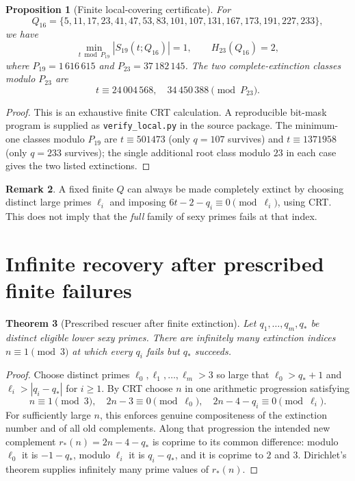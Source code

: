 \documentclass[11pt,a4paper]{article}
\newtheorem{theorem}{Theorem}[section]
\newtheorem{proposition}[theorem]{Proposition}
\theoremstyle{definition}
\newtheorem{remark}[theorem]{Remark}
\begin{document}
\begin{proposition}[Finite local-covering certificate]\label{prop:local}
For
\[
 Q_{16}=\{5,11,17,23,41,47,53,83,101,107,131,167,
 173,191,227,233\},
\]
we have
\[
 \min_{t\bmod P_{19}}|S_{19}(t;Q_{16})|=1,
 \qquad H_{23}(Q_{16})=2,
\]
where $P_{19}=1\,616\,615$ and $P_{23}=37\,182\,145$.
The two complete-extinction classes modulo $P_{23}$ are
\[
 t\equiv24\,004\,568,\quad34\,450\,388\pmod{P_{23}}.
\]
\end{proposition}
\begin{proof}
This is an exhaustive finite CRT calculation. A reproducible
bit-mask program is supplied as \texttt{verify\_local.py} in the
source package. The minimum-one classes modulo $P_{19}$ are
$t\equiv501473$ (only $q=107$ survives) and
$t\equiv1371958$ (only $q=233$ survives); the single additional
root class modulo $23$ in each case gives the two listed extinctions.
\end{proof}

\begin{remark}
A fixed finite $Q$ can always be made completely extinct by choosing
distinct large primes $\ell_i$ and imposing
$6t-2-q_i\equiv0\pmod{\ell_i}$, using CRT. This does not imply
that the \emph{full} family of sexy primes fails at that index.
\end{remark}

\section{Infinite recovery after prescribed finite failures}

\begin{theorem}[Prescribed rescuer after finite extinction]\label{thm:repair}
Let $q_1,\ldots,q_m,q_*$ be distinct eligible lower sexy primes.
There are infinitely many extinction indices $n\equiv1\pmod3$ at
which every $q_i$ fails but $q_*$ succeeds.
\end{theorem}
\begin{proof}
Choose distinct primes $\ell_0,\ell_1,\ldots,\ell_m>3$ so large
that $\ell_0>q_*+1$ and
$\ell_i>|q_i-q_*|$ for $i\ge1$. By CRT choose $n$ in one arithmetic
progression satisfying
\[
 n\equiv1\pmod3,\quad
 2n-3\equiv0\pmod{\ell_0},\quad
 2n-4-q_i\equiv0\pmod{\ell_i}.
\]
For sufficiently large $n$, this enforces genuine compositeness of
the extinction number and of all old complements. Along that
progression the intended new complement
$r_*(n)=2n-4-q_*$ is coprime to its common difference: modulo
$\ell_0$ it is $-1-q_*$, modulo $\ell_i$ it is $q_i-q_*$,
and it is coprime to $2$ and $3$. Dirichlet's theorem supplies
infinitely many prime values of $r_*(n)$.
\end{proof}
\end{document}
